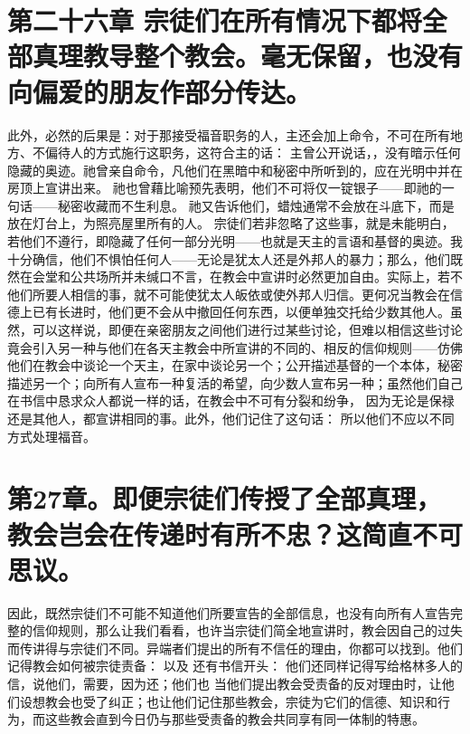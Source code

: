 
\section{第二十六章 宗徒们在所有情况下都将全部真理教导整个教会。毫无保留，也没有向偏爱的朋友作部分传达。}

此外，必然的后果是：对于那接受福音职务的人，主还会加上命令，不可在所有地方、不偏待人的方式施行这职务，这符合主的话： 主曾公开说话，，没有暗示任何隐藏的奥迹。祂曾亲自命令，凡他们在黑暗中和秘密中所听到的，应在光明中并在房顶上宣讲出来。 祂也曾藉比喻预先表明，他们不可将仅一锭银子——即祂的一句话——秘密收藏而不生利息。 祂又告诉他们，蜡烛通常不会放在斗底下，而是放在灯台上，为照亮屋里所有的人。 宗徒们若非忽略了这些事，就是未能明白，若他们不遵行，即隐藏了任何一部分光明——也就是天主的言语和基督的奥迹。我十分确信，他们不惧怕任何人——无论是犹太人还是外邦人的暴力；那么，他们既然在会堂和公共场所并未缄口不言，在教会中宣讲时必然更加自由。实际上，若不他们所要人相信的事，就不可能使犹太人皈依或使外邦人归信。更何况当教会在信德上已有长进时，他们更不会从中撤回任何东西，以便单独交托给少数其他人。虽然，可以这样说，即便在亲密朋友之间他们进行过某些讨论，但难以相信这些讨论竟会引入另一种与他们在各天主教会中所宣讲的不同的、相反的信仰规则——仿佛他们在教会中谈论一个天主，在家中谈论另一个；公开描述基督的一个本体，秘密描述另一个；向所有人宣布一种复活的希望，向少数人宣布另一种；虽然他们自己在书信中恳求众人都说一样的话，在教会中不可有分裂和纷争， 因为无论是保禄还是其他人，都宣讲相同的事。此外，他们记住了这句话： 所以他们不应以不同方式处理福音。\par


\section{第27章。即便宗徒们传授了全部真理，教会岂会在传递时有所不忠？这简直不可思议。}

因此，既然宗徒们不可能不知道他们所要宣告的全部信息，也没有向所有人宣告完整的信仰规则，那么让我们看看，也许当宗徒们简全地宣讲时，教会因自己的过失而传讲得与宗徒们不同。异端者们提出的所有不信任的理由，你都可以找到。他们记得教会如何被宗徒责备： 以及  还有书信开头： 他们还同样记得写给格林多人的信，说他们，需要，因为还；他们也 当他们提出教会受责备的反对理由时，让他们设想教会也受了纠正；也让他们记住那些教会，宗徒为它们的信德、知识和行为，而这些教会直到今日仍与那些受责备的教会共同享有同一体制的特惠。\par


